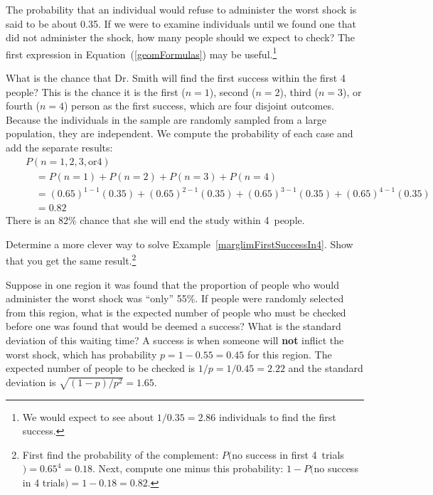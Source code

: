 \begin{exercise}
The probability that an individual would refuse to administer the worst shock is said to be about 0.35. If we were to examine individuals until we found one that did not administer the shock, how many people should we expect to check? The first expression in Equation~(\ref{geomFormulas}) may be useful.\footnote{We would expect to see about $1/0.35 = 2.86$ individuals to find the first success.}
\end{exercise}

\begin{example}{What is the chance that Dr. Smith will find the first success within the first 4 people?} \label{marglimFirstSuccessIn4}
This is the chance it is the first ($n=1$), second ($n=2$), third ($n=3$), or fourth ($n=4$) person as the first success, which are four disjoint outcomes. Because the individuals in the sample are randomly sampled from a large population, they are independent. We compute the probability of each case and add the separate results:
\begin{eqnarray*}
&&P(n=1, 2, 3,\text{or}4) \\
	&& \quad = P(n=1)+P(n=2)+P(n=3)+P(n=4) \\
	&& \quad = (0.65)^{1-1}(0.35) + (0.65)^{2-1}(0.35) + (0.65)^{3-1}(0.35) + (0.65)^{4-1}(0.35) \\
	&& \quad = 0.82
\end{eqnarray*}
There is an 82\% chance that she will end the study within 4~people.
\end{example}

\begin{exercise}
Determine a more clever way to solve Example~\ref{marglimFirstSuccessIn4}. Show that you get the same result.\footnote{First find the probability of the complement: $P($no success in first 4~trials$) = 0.65^4 = 0.18$. Next, compute one minus this probability: $1-P($no success in 4 trials$) = 1-0.18 = 0.82$.}
\end{exercise}

\begin{example}{Suppose in one region it was found that the proportion of people who would administer the worst shock was ``only'' 55\%. If people were randomly selected from this region, what is the expected number of people who must be checked before one was found that would be deemed a success? What is the standard deviation of this waiting time?} \label{onlyShocking55PercOfTheTimeExample}
A success is when someone will \textbf{not} inflict the worst shock, which has probability $p=1-0.55=0.45$ for this region. The expected number of people to be checked is $1/p = 1/0.45 = 2.22$ and the standard deviation is $\sqrt{(1-p)/p^2} = 1.65$.
\end{example}


